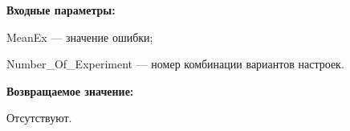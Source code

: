 \textbf{Входные параметры:}

MeanEx --- значение ошибки;
 
    Number\_Of\_Experiment --- номер комбинации вариантов настроек.

\textbf{Возвращаемое значение:}

Отсутствуют.